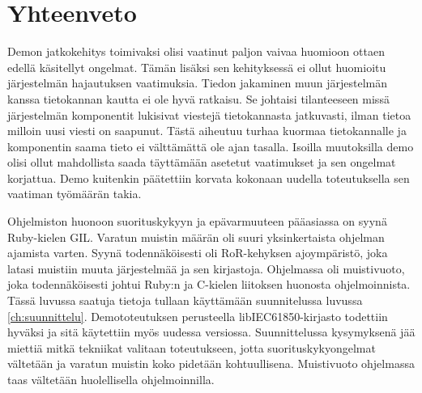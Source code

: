 \section{Yhteenveto}
Demon jatkokehitys toimivaksi olisi vaatinut paljon vaivaa huomioon ottaen edellä käsitellyt ongelmat. Tämän lisäksi sen kehityksessä ei ollut huomioitu järjestelmän hajautuksen vaatimuksia. Tiedon jakaminen muun järjestelmän kanssa tietokannan kautta ei ole hyvä ratkaisu. Se johtaisi tilanteeseen missä järjestelmän komponentit lukisivat viestejä tietokannasta jatkuvasti, ilman tietoa milloin uusi viesti on saapunut. Tästä aiheutuu turhaa kuormaa tietokannalle ja komponentin saama tieto ei välttämättä ole ajan tasalla. Isoilla muutoksilla demo olisi ollut mahdollista saada täyttämään asetetut vaatimukset ja sen ongelmat korjattua. Demo kuitenkin päätettiin korvata kokonaan uudella toteutuksella sen vaatiman työmäärän takia.

Ohjelmiston huonoon suorituskykyyn ja epävarmuuteen pääasiassa on syynä Ruby-kielen GIL. Varatun muistin määrän oli suuri yksinkertaista ohjelman ajamista varten. Syynä todennäköisesti oli RoR-kehyksen ajoympäristö, joka latasi muistiin muuta järjestelmää ja sen kirjastoja. Ohjelmassa oli muistivuoto, joka todennäköisesti johtui Ruby:n ja C-kielen liitoksen huonosta ohjelmoinnista. Tässä luvussa saatuja tietoja tullaan käyttämään suunnitelussa luvussa \ref{ch:suunnittelu}. Demototeutuksen perusteella libIEC61850-kirjasto todettiin hyväksi ja sitä käytettiin myös uudessa versiossa. Suunnittelussa kysymyksenä jää miettiä mitkä tekniikat valitaan toteutukseen, jotta suorituskykyongelmat vältetään ja varatun muistin koko pidetään kohtuullisena. Muistivuoto ohjelmassa taas vältetään huolellisella ohjelmoinnilla.
